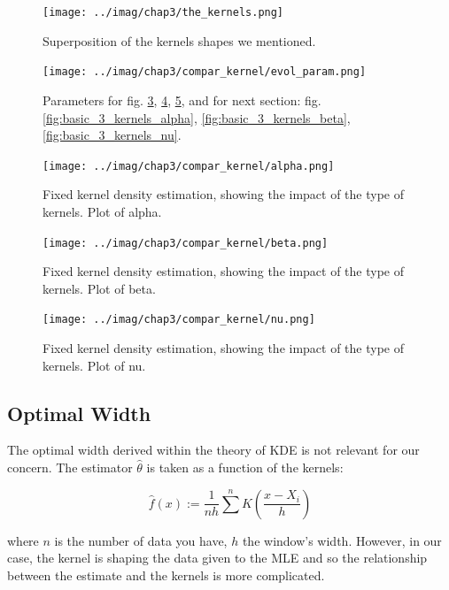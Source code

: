\documentclass[11pt]{book}
\begin{document}
\begin{figure}
\centering
\texttt{[image: ../imag/chap3/the\_kernels.png]}
\caption{Superposition of the kernels shapes we mentioned.}
\label{fig:kernels_list}
\end{figure}


\begin{figure}
\centering
\texttt{[image: ../imag/chap3/compar\_kernel/evol\_param.png]}
\caption{Parameters for fig. \ref{fig:basic_5_kernels_alpha}, \ref{fig:basic_5_kernels_beta}, \ref{fig:basic_5_kernels_nu}, and for next section: fig. \ref{fig:basic_3_kernels_alpha}, \ref{fig:basic_3_kernels_beta}, \ref{fig:basic_3_kernels_nu}. }
\label{fig:evol_choice_basic}
\end{figure}


\begin{figure}
\centering
\texttt{[image: ../imag/chap3/compar\_kernel/alpha.png]}
\caption{Fixed kernel density estimation, showing the impact of the type of kernels. Plot of alpha.}
\label{fig:basic_5_kernels_alpha}
\end{figure}

\begin{figure}
\centering
\texttt{[image: ../imag/chap3/compar\_kernel/beta.png]}
\caption{Fixed kernel density estimation, showing the impact of the type of kernels. Plot of beta.}
\label{fig:basic_5_kernels_beta}
\end{figure}

\begin{figure}
\centering
\texttt{[image: ../imag/chap3/compar\_kernel/nu.png]}
\caption{Fixed kernel density estimation, showing the impact of the type of kernels. Plot of nu.}
\label{fig:basic_5_kernels_nu}
\end{figure}







\subsection{Optimal Width}
\label{subsection:optimal_width}


The optimal width derived within the theory of KDE is not relevant for our concern. The estimator $\widehat{\theta}$ is taken as a function of the kernels:

$$ \hat{f}(x) := \frac 1 {n h} \sum^n K \left ( \frac{x - X_i } {h}  \right )$$

where $n$ is the number of data you have, $h$ the window's width. However, in our case, the kernel is shaping the data given to the MLE and so the relationship between the estimate and the kernels is more complicated.
\end{document}
